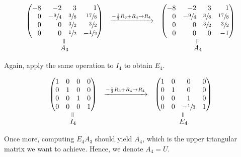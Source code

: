 \documentclass[12pt]{article}
\newcommand{\veq}{\mathrel{\rotatebox{90}{$=$}}}
\begin{document}
$$
\begin{array}{ccc}
    \begin{pmatrix*}[r]
        -8 & -2 & 3 & 1 \\
        0 & -\sfrac{9}{4} & \sfrac{3}{8}  & \sfrac{17}{8} \\
        0 & 0 & \sfrac{3}{2} & \sfrac{3}{2} \\
        0 & 0 & \sfrac{1}{2} & -\sfrac{1}{2}
    \end{pmatrix*}
    &\xrightarrow{-\frac{1}{3}R_3 + R_4 \to R_4}
    &\begin{pmatrix*}[r]
        -8 & -2 & 3 & 1 \\
        0 & -\sfrac{9}{4} & \sfrac{3}{8}  & \sfrac{17}{8} \\
        0 & 0 & \sfrac{3}{2} & \sfrac{3}{2} \\
        0 & 0 & 0 & -1
    \end{pmatrix*}
    \\
    \overset{\veq}{A_3} & & \overset{\veq}{A_4}
\end{array}
$$

Again, apply the same operation to $I_4$ to obtain $E_4$.

$$
\begin{array}{ccc}
    \begin{pmatrix*}[c]
        1 & 0 & 0 & 0 \\
        0 & 1 & 0 & 0 \\
        0 & 0 & 1 & 0 \\
        0 & 0 & 0 & 1
    \end{pmatrix*}
    &\xrightarrow{-\frac{1}{3}R_3 + R_4 \to R_4}
    &\begin{pmatrix*}[c]
        1 & 0 & 0 & 0 \\
        0 & 1 & 0 & 0 \\
        0 & 0 & 1 & 0 \\
        0 & 0 & -\sfrac{1}{3} & 1
    \end{pmatrix*}
    \\
    \overset{\veq}{I_4} & & \overset{\veq}{E_4}
\end{array}
$$

Once more, computing $E_4A_3$ should yield $A_4$, which is the upper triangular matrix we want to achieve. Hence, we denote $A_4 = U$.
\end{document}
